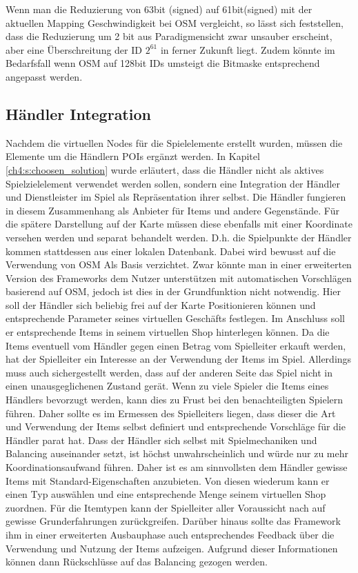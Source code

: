 Wenn man die Reduzierung von 63bit (signed) auf 61bit(signed) mit der aktuellen Mapping Geschwindigkeit bei OSM vergleicht, so lässt sich feststellen, dass die Reduzierung um 2 bit aus Paradigmensicht zwar unsauber erscheint, aber eine Überschreitung der ID \begin{math}2^{61}\end{math} in ferner Zukunft liegt. Zudem könnte im Bedarfsfall wenn OSM auf 128bit IDs umsteigt die Bitmaske entsprechend angepasst werden.

\subsection*{Händler Integration}

Nachdem die virtuellen Nodes für die Spielelemente erstellt wurden, müssen die Elemente um die Händlern POIs ergänzt werden. In Kapitel \ref{ch4:s:choosen_solution} wurde erläutert, dass die Händler nicht als aktives Spielzielelement verwendet werden sollen, sondern eine Integration der Händler und Dienstleister im Spiel als Repräsentation ihrer selbst. Die Händler fungieren in diesem Zusammenhang als Anbieter für Items und andere Gegenstände. Für die spätere Darstellung auf der Karte müssen diese ebenfalls mit einer Koordinate versehen werden und separat behandelt werden. D.h. die Spielpunkte der Händler kommen stattdessen aus einer lokalen Datenbank. Dabei wird bewusst auf die Verwendung von OSM Als Basis verzichtet. Zwar könnte man in einer erweiterten Version des Frameworks dem Nutzer unterstützen mit automatischen Vorschlägen basierend auf OSM, jedoch ist dies in der Grundfunktion nicht notwendig. Hier soll der Händler sich beliebig frei auf der Karte Positionieren können und entsprechende Parameter seines virtuellen Geschäfts festlegen. Im Anschluss soll er entsprechende Items in seinem virtuellen Shop hinterlegen können. Da die Items eventuell vom Händler gegen einen Betrag vom Spielleiter erkauft werden, hat der Spielleiter ein  Interesse an der Verwendung der Items im Spiel. Allerdings muss auch sichergestellt werden, dass auf der anderen Seite das Spiel nicht in einen unausgeglichenen Zustand gerät. Wenn zu viele Spieler die Items eines Händlers bevorzugt werden, kann dies zu Frust bei den benachteiligten Spielern führen. Daher sollte es im Ermessen des Spielleiters liegen, dass dieser die Art und Verwendung der Items selbst definiert und entsprechende Vorschläge für die Händler parat hat. Dass der Händler sich selbst mit Spielmechaniken und Balancing auseinander setzt, ist höchst unwahrscheinlich und würde nur zu mehr Koordinationsaufwand führen. Daher ist es am sinnvollsten dem Händler gewisse Items mit Standard-Eigenschaften anzubieten. Von diesen wiederum kann er einen Typ auswählen und eine entsprechende Menge seinem virtuellen Shop zuordnen.
Für die Itemtypen kann der Spielleiter aller Voraussicht nach auf gewisse Grunderfahrungen zurückgreifen. Darüber hinaus sollte das Framework ihm in einer erweiterten Ausbauphase auch entsprechendes Feedback über die Verwendung und Nutzung der Items aufzeigen. Aufgrund dieser Informationen können dann Rückschlüsse auf das Balancing gezogen werden.

